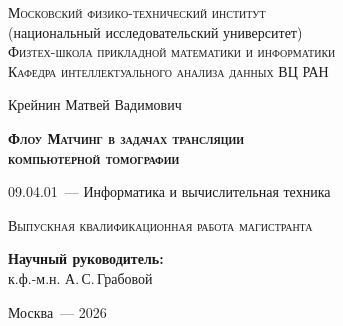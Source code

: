\thispagestyle{empty}

\begin{titlepage}
    \begin{center}
        \textsc{Московский физико-технический институт}\\
        (национальный исследовательский университет)\\
        \textsc{Физтех-школа прикладной математики и информатики}\\
        \textsc{Кафедра интеллектуального анализа данных ВЦ РАН}
    \end{center}
    \vspace{2.5cm}
    \begin{center}
        {Крейнин Матвей Вадимович}
        \par
        \vspace{2cm}
        {\Large \textsc{\textbf{Флоу Матчинг в задачах трансляции\\компьютерной томографии}}}
        \par
        \vspace{2cm}
        {09.04.01~--- Информатика и вычислительная техника}
        \par
        \vspace{2cm}
        \textsc{Выпускная квалификационная работа магистранта}
    \end{center}
    \vspace{2cm}
    \hfill\parbox{8.4cm}{\textbf{Научный руководитель:}
    \\к.ф.-м.н. А.\,С.\,Грабовой}
    \par
    \vspace{2.5cm}
    \begin{center}
        {Москва~--- 2026}
    \end{center}
\end{titlepage}

